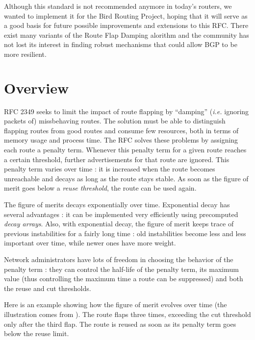 \documentclass[a4paper,english]{IEEEtran}
\begin{document}
Although this standard is not recommended anymore\cite{ripe recommendations}
in today's routers, we wanted to implement it for the Bird Routing
Project\cite{bird}, hoping that it will serve as a good basis for
future possible improvements and extensions to this RFC. There exist
many variants of the Route Flap Damping alorithm and the community
has not lost its interest in finding robust mechanisms that could
allow BGP to be more resilient.


\section{Overview}

RFC 2349 seeks to limit the impact of route flapping by ``damping''
(\textit{i.e.} ignoring packets of) missbehaving routes. The solution
must be able to distinguish flapping routes from good routes and consume
few resources, both in terms of memory usage and process time. The
RFC solves these problems by assigning each route a penalty term.
Whenever this penalty term for a given route reaches a certain threshold,
further advertisements for that route are ignored. This penalty term
varies over time : it is increased when the route becomes unreachable
and decays as long as the route stays stable. As soon as the figure
of merit goes below a \textit{reuse threshold}, the route can be used
again.

The figure of merits decays exponentially over time. Exponential decay
has several advantages : it can be implemented very efficiently using
precomputed \textit{decay arrays}. Also, with exponential decay, the
figure of merit keeps trace of previous instabilities for a fairly
long time : old instabilities become less and less important over
time, while newer ones have more weight.

Network administrators have lots of freedom in choosing the behavior
of the penalty term : they can control the half-life of the penalty
term, its maximum value (thus controlling the maximum time a route
can be suppressed) and both the reuse and cut thresholds.

Here is an example showing how the figure of merit evolves over time
(the illustration comes from \cite{damping-pic}). The route flaps
three times, exceeding the cut threshold only after the third flap.
The route is reused as soon as its penalty term goes below the reuse
limit.
\end{document}
